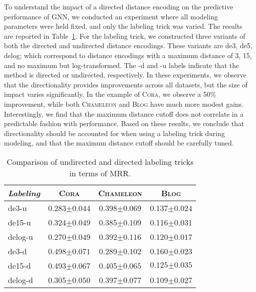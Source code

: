 \documentclass{article}
\begin{document}
To understand the impact of a directed distance encoding on the predictive performance of GNN, we conducted an experiment where all modeling parameters were held fixed, and only the labeling trick was varied. The results are reported in Table~\ref{t:ablation_labeling}. For the labeling trick, we constructed three variants of both the directed and undirected distance encodings. These variants are de3, de5, delog; which correspond to distance encodings with  a maximum distance of 3, 15, and no maximum but log-transformed. The -d and -u labels indicate that the method is directed or undirected, respectively. In these experiments, we observe that the directionality provides improvements across all datasets, but the size of impact varies significantly. In the example of \textsc{Cora}, we observe a 50\% improvement, while both \textsc{Chameleon} and \textsc{Blog} have much more modest gains. Interestingly, we find that the maximum distance cutoff does not correlate in a predictable fashion with performance. Based on these results, we conclude that directionality should be accounted for when using a labeling trick during modeling, and that the maximum distance cutoff should be carefully tuned.

\begin{table}[h]
\caption{Comparison of undirected and directed labeling tricks  in terms of MRR. } 
\centering
\begin{tabular}{l c c c}
\textit{Labeling}  & \textsc{Cora}  & \textsc{Chameleon} & \textsc{Blog}  \\
\hline
de3-u      & 0.283${\scriptstyle\pm0.044}$ & 0.398${\scriptstyle\pm0.069}$ &  0.137${\scriptstyle\pm0.024}$ \\
de15-u     & 0.324${\scriptstyle\pm0.049}$ & 0.385${\scriptstyle\pm0.109}$ &  0.116${\scriptstyle\pm0.031}$ \\
delog-u    & 0.270${\scriptstyle\pm0.049}$ & 0.392${\scriptstyle\pm0.116}$ &  0.120${\scriptstyle\pm0.017}$ \\
\hline
de3-d        & \textcolor{junscolor1}{0.498${\scriptstyle\pm0.071}$} & 0.289${\scriptstyle\pm0.102}$ &  \textcolor{junscolor1}{0.160${\scriptstyle\pm0.023}$} \\
de15-d      & 0.493${\scriptstyle\pm0.067}$ & \textcolor{junscolor1}{0.405${\scriptstyle\pm0.065}$} &  $0.125{\scriptstyle\pm0.035}$ \\
delog-d      & 0.305${\scriptstyle\pm0.050}$ & 0.397${\scriptstyle\pm0.077}$ &  0.109${\scriptstyle\pm0.027}$
\end{tabular}
\label{t:ablation_labeling}
\end{table}
\end{document}
